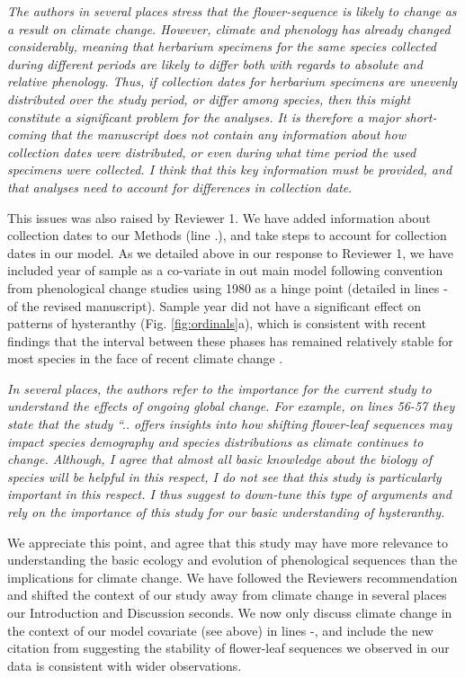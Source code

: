 \documentclass{article}[12pt]
\begin{document}
\emph{The authors in several places stress that the flower-sequence is likely to change as a result on climate change. However, climate and phenology has already changed considerably, meaning that herbarium specimens for the same species collected during different periods are likely to differ both with regards to absolute and relative phenology. Thus, if collection dates for herbarium specimens are unevenly distributed over the study period, or differ among species, then this might constitute a significant problem for the analyses. It is therefore a major short-coming that the manuscript does not contain any information about how collection dates were distributed, or even during what time period the used specimens were collected. I think that this key information must be provided, and that analyses need to account for differences in collection date}.


This issues was also raised by Reviewer 1. We have added information about collection dates to our Methods (line .), and take steps to account for collection dates in our model. As we detailed above in our response to  Reviewer 1, we have included year of sample as a co-variate in out main model following convention from phenological change studies using 1980 as a hinge point (detailed in lines - of the revised manuscript). Sample year did not have a significant effect on patterns of hysteranthy (Fig. \ref{fig:ordinals}a), which is consistent with recent findings that the interval between these phases has remained relatively stable for most species in the face of recent climate change \citep{Guo:2023wb}. 


\emph{In several places, the authors refer to the importance for the current study to understand the effects of ongoing global change. For example, on lines 56-57 they state that the study “.. offers insights into how shifting flower-leaf sequences may impact species demography and species distributions as climate continues to change. Although, I agree that almost all basic knowledge about the biology of species will be helpful in this respect, I do not see that this study is particularly important in this respect. I thus suggest to down-tune this type of arguments and rely on the importance of this study for our basic understanding of hysteranthy.}

We appreciate this point, and agree that this study may have more relevance to understanding the basic ecology and evolution of phenological sequences than the implications for climate change. We have followed the Reviewers recommendation and shifted the context of our study away from climate change in several places our Introduction and Discussion seconds. We now only discuss climate change in the context of our model covariate (see above) in lines -, and include the new citation from \citet{Guo:2023wb} suggesting the stability of flower-leaf sequences we observed in our data is consistent with wider observations.
\end{document}
